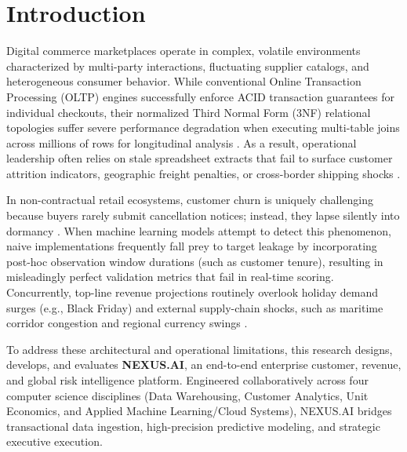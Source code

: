 \documentclass[conference]{IEEEtran}
\begin{document}
\section{Introduction}
Digital commerce marketplaces operate in complex, volatile environments characterized by multi-party interactions, fluctuating supplier catalogs, and heterogeneous consumer behavior. While conventional Online Transaction Processing (OLTP) engines successfully enforce ACID transaction guarantees for individual checkouts, their normalized Third Normal Form (3NF) relational topologies suffer severe performance degradation when executing multi-table joins across millions of rows for longitudinal analysis . As a result, operational leadership often relies on stale spreadsheet extracts that fail to surface customer attrition indicators, geographic freight penalties, or cross-border shipping shocks .

In non-contractual retail ecosystems, customer churn is uniquely challenging because buyers rarely submit cancellation notices; instead, they lapse silently into dormancy . When machine learning models attempt to detect this phenomenon, naive implementations frequently fall prey to target leakage by incorporating post-hoc observation window durations (such as customer tenure), resulting in misleadingly perfect validation metrics that fail in real-time scoring. Concurrently, top-line revenue projections routinely overlook holiday demand surges (e.g., Black Friday) and external supply-chain shocks, such as maritime corridor congestion and regional currency swings .

To address these architectural and operational limitations, this research designs, develops, and evaluates \textbf{NEXUS.AI}, an end-to-end enterprise customer, revenue, and global risk intelligence platform. Engineered collaboratively across four computer science disciplines (Data Warehousing, Customer Analytics, Unit Economics, and Applied Machine Learning/Cloud Systems), NEXUS.AI bridges transactional data ingestion, high-precision predictive modeling, and strategic executive execution.
\end{document}
